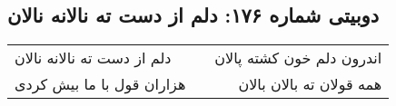 \begin{center}
\section*{دوبیتی شماره ۱۷۶: دلم از دست ته نالانه نالان}
\label{sec:176}
\begin{longtable}{l p{0.5cm} r}
دلم از دست ته نالانه نالان
&&
اندرون دلم خون کشته پالان
\\
هزاران قول با ما بیش کردی
&&
همه قولان ته بالان بالان
\\
\end{longtable}
\end{center}
